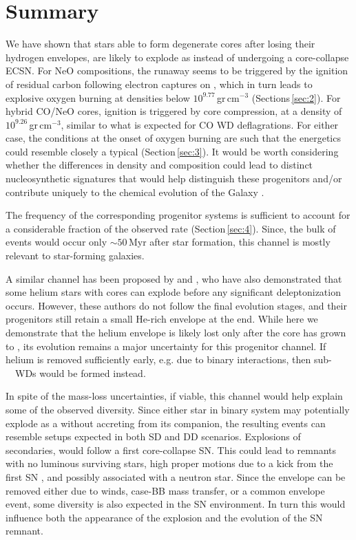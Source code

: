 \documentclass{aa}
\begin{document}
\section{Summary}\label{sec:5}
We have shown that stars able to form degenerate \one cores after losing 
their hydrogen  envelopes, are likely to explode as \ias instead of undergoing a core-collapse  ECSN. 
For NeO compositions, the runaway seems to be triggered by the ignition of 
residual carbon following electron captures on , which in turn 
leads to explosive oxygen burning at densities below $10^{9.77}$\,gr\,cm$^{-3}$ (Sections\,\ref{sec:2}). 
For hybrid CO/NeO cores, ignition is triggered by core compression, at a density of $10^{9.26}$\,gr\,cm$^{-3}$, similar to what is expected for CO WD deflagrations. For either case, the conditions at the onset of oxygen burning are such that the energetics  could resemble closely a typical \ias  (Section\,\ref{sec:3}). 
It would be worth considering whether the differences in density and 
composition could lead to distinct nucleosynthetic signatures that would help 
distinguish these progenitors and/or contribute uniquely to the chemical 
evolution of the Galaxy \citep[in analogy to ][for ECSNe]{Jones:2018ule}.



The frequency of the corresponding progenitor systems 
is sufficient to account for a considerable fraction of the observed \ia  rate  (Section\,\ref{sec:4}). Since, the bulk of events would occur only $\sim 50$\,Myr after star formation, this channel is mostly relevant to star-forming galaxies. 

A similar \ia channel has  been proposed by \cite{waldman2006a} and \cite{waldman2008}, who have also demonstrated that some helium stars with \one cores can explode before any significant deleptonization occurs. However, these authors do not follow the final evolution stages, and their progenitors still retain a small He-rich envelope at the end. While here we demonstrate that the helium envelope is  likely lost only  after the core has grown to \mch, its evolution remains a major uncertainty for this progenitor channel. If helium is removed sufficiently early, e.g. due to binary interactions, then sub-\mch\ \one\ WDs would be formed instead. 
 
In spite of the mass-loss uncertainties, if viable, this channel would help explain some of the observed \ia diversity. Since either star in binary system may potentially explode as a \ia without accreting from its  companion, the resulting events can resemble setups expected in both SD and DD scenarios. Explosions of secondaries, would follow a first core-collapse SN. This could lead to \ia remnants with no luminous surviving stars, high proper motions due to a kick from the first SN \cite[like the Kepler remnant,][]{Chiotellis:2011jy}, and possibly associated with a neutron star. 
Since the  envelope can be removed either due to winds, case-BB mass transfer, or a common envelope event, some diversity is also expected in the SN environment. In turn this would influence both the appearance of the explosion and the evolution of the SN remnant. 
\end{document}
